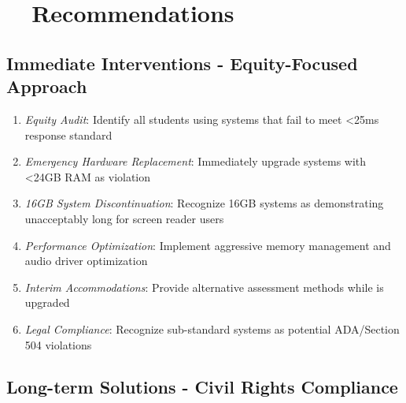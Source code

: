 \pagebreak

\hypertarget{recommendations}{}\section{~~Recommendations}\label{recommendations}

\subsection{Immediate Interventions - Equity-Focused Approach}\label{immediate-interventions-equity-focused-approach}

\begin{enumerate}
	\item \emph{Equity Audit}: Identify all students using systems that fail to meet <25ms response standard \supercite{EducationalEquityReport2024}
	\item \emph{Emergency Hardware Replacement}: Immediately upgrade systems with <24GB RAM as  violation \supercite{ADA1990, Section504RehabAct}
	\item \emph{16GB System Discontinuation}: Recognize 16GB systems as demonstrating unacceptably long  for screen reader users \supercite{EducationalEquityReport2024}
	\item \emph{Performance Optimization}: Implement aggressive memory management and audio driver optimization \supercite{SystemOptimizationGuides}
	\item \emph{Interim Accommodations}: Provide alternative assessment methods while  is upgraded \supercite{AccommodationsBestPractices}
	\item \emph{Legal Compliance}: Recognize sub-standard systems as potential ADA/Section 504 violations \supercite{ADA1990, Section504RehabAct}
\end{enumerate}

\subsection{Long-term Solutions - Civil Rights Compliance}\label{long-term-solutions-civil-rights-compliance}

